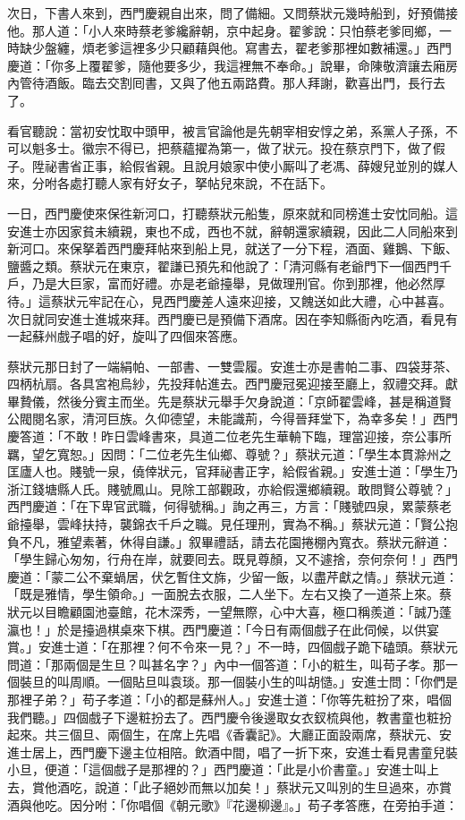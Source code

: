 次日，下書人來到，西門慶親自出來，問了備細。又問蔡狀元幾時船到，好預備接他。那人道：「小人來時蔡老爹纔辭朝，京中起身。翟爹說：只怕蔡老爹囘鄉，一時缺少盤纏，煩老爹這裡多少只顧藉與他。寫書去，翟老爹那裡如數補還。」西門慶道：「你多上覆翟爹，隨他要多少，我這裡無不奉命。」說畢，命陳敬濟讓去廂房內管待酒飯。臨去交割囘書，又與了他五兩路費。那人拜謝，歡喜出門，長行去了。

看官聽說：當初安忱取中頭甲，被言官論他是先朝宰相安惇之弟，系黨人子孫，不可以魁多士。徽宗不得已，把蔡蘊擢為第一，做了狀元。投在蔡京門下，做了假子。陞祕書省正事，給假省親。且說月娘家中使小厮叫了老馮、薛嫂兒並別的媒人來，分咐各處打聽人家有好女子，拏帖兒來說，不在話下。

一日，西門慶使來保徃新河口，打聽蔡狀元船隻，原來就和同榜進士安忱同船。這安進士亦因家貧未續親，東也不成，西也不就，辭朝還家續親，因此二人同船來到新河口。來保拏着西門慶拜帖來到船上見，就送了一分下程，酒面、雞鵝、下飯、鹽醬之類。蔡狀元在東京，翟謙已預先和他說了：「清河縣有老爺門下一個西門千戶，乃是大巨家，富而好禮。亦是老爺擡舉，見做理刑官。你到那裡，他必然厚待。」這蔡狀元牢記在心，{}見西門慶差人遠來迎接，又餽送如此大禮，心中甚喜。次日就同安進士進城來拜。西門慶已是預備下酒席。因在李知縣衙內吃酒，看見有一起蘇州戲子唱的好，旋叫了四個來答應。

蔡狀元那日封了一端絹帕、一部書、一雙雲履。安進士亦是書帕二事、四袋芽茶、四柄杭扇。各具宮袍烏紗，先投拜帖進去。西門慶冠冕迎接至廳上，叙禮交拜。獻畢贄儀，然後分賓主而坐。先是蔡狀元舉手欠身說道：「京師翟雲峰，{}甚是稱道賢公閥閱名家，清河巨族。久仰德望，未能識荊，今得晉拜堂下，為幸多矣！」西門慶答道：「不敢！昨日雲峰書來，具道二位老先生華輈下臨，理當迎接，奈公事所羈，望乞寬恕。」因問：「二位老先生仙鄉、尊號？」蔡狀元道：「學生本貫滁州之匡廬人也。賤號一泉，僥倖狀元，官拜祕書正字，給假省親。」安進士道：「學生乃浙江錢塘縣人氏。賤號鳳山。見除工部觀政，亦給假還鄉續親。敢問賢公尊號？」西門慶道：「在下卑官武職，何得號稱。」詢之再三，方言：「賤號四泉，累蒙蔡老爺擡舉，雲峰扶持，襲錦衣千戶之職。見任理刑，實為不稱。」蔡狀元道：「賢公抱負不凡，雅望素著，休得自謙。」叙畢禮話，請去花園捲棚內寬衣。蔡狀元辭道：「學生歸心匆匆，行舟在岸，就要囘去。既見尊顏，又不遽捨，奈何奈何！」{}西門慶道：「蒙二公不棄蝸居，伏乞暫住文旆，少留一飯，以盡芹獻之情。」蔡狀元道：「既是雅情，學生領命。」一面脫去衣服，二人坐下。左右又換了一道茶上來。蔡狀元以目瞻顧園池臺館，花木深秀，一望無際，心中大喜，極口稱羨道：「誠乃蓬瀛也！」於是擡過棋桌來下棋。西門慶道：「今日有兩個戲子在此伺候，以供宴賞。」安進士道：「在那裡？何不令來一見？」不一時，四個戲子跪下磕頭。蔡狀元問道：「那兩個是生旦？叫甚名字？」內中一個答道：「小的粧生，叫苟子孝。那一個裝旦的叫周順。一個貼旦叫袁琰。那一個裝小生的叫胡慥。」安進士問：「你們是那裡子弟？」苟子孝道：「小的都是蘇州人。」安進士道：「你等先粧扮了來，唱個我們聽。」四個戲子下邊粧扮去了。西門慶令後邊取女衣釵梳與他，教書童也粧扮起來。共三個旦、兩個生，在席上先唱《香囊記》。大廳正面設兩席，蔡狀元、安進士居上，西門慶下邊主位相陪。飲酒中間，唱了一折下來，安進士看見書童兒裝小旦，便道：「這個戲子是那裡的？」西門慶道：「此是小价書童。」安進士叫上去，賞他酒吃，說道：「此子絕妙而無以加矣！」蔡狀元又叫別的生旦過來，亦賞酒與他吃。因分咐：「你唱個《朝元歌》『花邊柳邊』。」苟子孝答應，在旁拍手道：


